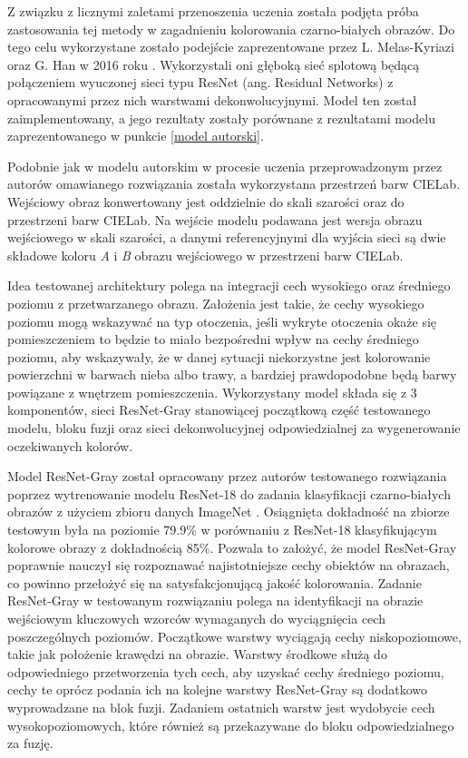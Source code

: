   Z związku z licznymi zaletami przenoszenia uczenia została podjęta próba
  zastosowania tej metody w
  zagadnieniu kolorowania czarno-białych obrazów. Do tego celu wykorzystane
  zostało podejście zaprezentowane przez L. Melas-Kyriazi oraz G. Han w 2016
  roku \cite{deconvolution_colorization}. Wykorzystali oni głęboką sieć
  splotową będącą połączeniem wyuczonej sieci typu ResNet
  (ang. Residual Networks) \cite{ResNet}
  z opracowanymi przez nich warstwami dekonwolucyjnymi. Model ten został
  zaimplementowany, a jego rezultaty zostały porównane z
  rezultatami modelu zaprezentowanego w punkcie \ref{model autorski}.

  Podobnie jak w modelu autorskim w procesie uczenia przeprowadzonym przez
  autorów omawianego rozwiązania została wykorzystana przestrzeń
  barw CIELab. Wejściowy obraz konwertowany jest oddzielnie do skali szarości oraz do
  przestrzeni barw CIELab. Na wejście modelu podawana jest wersja obrazu
  wejściowego w skali szarości, a danymi referencyjnymi dla wyjścia sieci są
  dwie składowe koloru \textit{A} i \textit{B} obrazu wejściowego w
  przestrzeni barw CIELab.

  Idea testowanej architektury
  polega na integracji cech wysokiego oraz średniego poziomu z przetwarzanego obrazu.
  Założenia jest takie, że cechy wysokiego poziomu mogą wskazywać na typ otoczenia, jeśli
  wykryte otoczenia okaże się pomieszczeniem to będzie to miało bezpośredni wpływ
  na cechy średniego poziomu, aby wskazywały, że w danej
  sytuacji niekorzystne jest kolorowanie powierzchni w barwach nieba albo trawy,
  a bardziej prawdopodobne będą barwy powiązane z wnętrzem pomieszczenia.
  Wykorzystany model składa się z 3 komponentów, sieci ResNet-Gray stanowiącej
  początkową część testowanego modelu, bloku fuzji oraz sieci dekonwolucyjnej
  odpowiedzialnej za wygenerowanie oczekiwanych kolorów.

  Model ResNet-Gray został opracowany przez autorów testowanego rozwiązania poprzez
  wytrenowanie modelu ResNet-18 do zadania klasyfikacji czarno-białych obrazów
  z użyciem zbioru danych ImageNet \cite{ImageNet}. Osiągnięta dokładność na zbiorze testowym
  była na poziomie 79.9\% w porównaniu z ResNet-18 klasyfikującym kolorowe obrazy z
  dokładnością 85\%. Pozwala to założyć, że model ResNet-Gray poprawnie nauczył
  się rozpoznawać najistotniejsze cechy obiektów na obrazach, co powinno
  przełożyć się na satysfakcjonującą jakość kolorowania.
  Zadanie ResNet-Gray w testowanym rozwiązaniu polega na identyfikacji
  na obrazie wejściowym kluczowych wzorców wymaganych do wyciągnięcia cech
  poszczególnych poziomów. Początkowe warstwy wyciągają cechy niskopoziomowe, takie jak położenie krawędzi na obrazie. Warstwy środkowe
  służą do odpowiedniego przetworzenia tych cech, aby uzyskać cechy średniego poziomu,
  cechy te oprócz podania ich na kolejne warstwy ResNet-Gray są dodatkowo wyprowadzane
  na blok fuzji. Zadaniem ostatnich warstw jest wydobycie cech
  wysokopoziomowych, które również są przekazywane do bloku odpowiedzialnego za
  fuzję.

